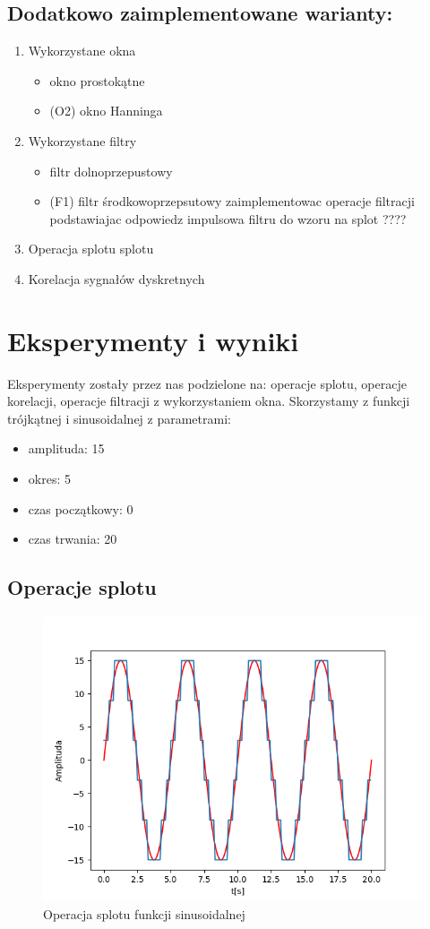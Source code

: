 \documentclass[12pt]{article}
\begin{document}
\subsection {Dodatkowo zaimplementowane warianty:}
\begin {enumerate}
\item Wykorzystane okna
\begin {itemize}
 \item okno prostokątne
\item (O2) okno Hanninga
\end {itemize}
\item Wykorzystane filtry
\begin {itemize}
\item filtr dolnoprzepustowy
\item (F1) filtr środkowoprzepsutowy
zaimplementowac operacje filtracji podstawiajac odpowiedz impulsowa filtru do wzoru na 
splot ????
\end {itemize}
\item  Operacja splotu splotu 
\item Korelacja sygnałów dyskretnych 
\end{enumerate}

\section{Eksperymenty i wyniki}
Eksperymenty zostały przez nas podzielone na: operacje splotu, operacje korelacji, operacje filtracji z wykorzystaniem okna. Skorzystamy z funkcji trójkątnej i sinusoidalnej z parametrami:
\begin{itemize}
\item amplituda: 15
\item okres: 5
\item czas początkowy: 0
\item czas trwania: 20
\end{itemize}
\subsection{Operacje splotu}
\begin{figure}[H]
\centering
\includegraphics[scale=0.6]{1sinusKwantStopien5.png}
\caption{Operacja splotu funkcji sinusoidalnej}
\end{figure}
\end{document}
